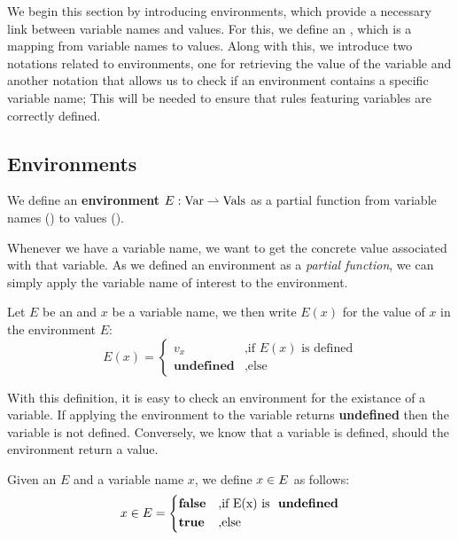 We begin this section by introducing environments, which provide a necessary link between variable names and values. For this, we define an , which is a mapping from variable names to values. Along with this, we introduce two notations related to environments, one for retrieving the value of the variable and another notation that allows us to check if an environment contains a specific variable name; This will be needed to ensure that rules featuring variables are correctly defined.

\subsection{Environments}\label{sec:environments}

\begin{definition}[Environment]\label{def:environment}
   We define an \textbf{environment} \(E: \text{\Var} \partialto \text{\Vals}\) as a partial function from variable names (\Var) to values (\Vals). 
\end{definition}

Whenever we have a variable name, we want to get the concrete value associated with that variable. As we defined an environment as a \emph{partial function}, we can simply apply the variable name of interest to the environment.

\begin{definition}\label{def:environment-getter}	
   Let \(E\) be an  and \(x\) be a variable name, we then write \(E(x)\) for the value of \(x\) in the environment \(E\):
   \[
      E(x) =
      \begin{cases}
	 v_x		    & \mbox{,if } E(x) \text{ is defined} \\
	 \textbf{undefined} &\mbox{,else}
      \end{cases}
   \]
\end{definition}

With this definition, it is easy to check an environment for the existance of a variable. If applying the environment to the variable returns \textbf{undefined} then the variable is not defined. Conversely, we know that a variable is defined, should the environment return a value.

\begin{definition}\label{def:in-environment}
   Given an  \(E\) and a variable name \(x\), we define \(\contains{E}{x}\) as follows:
   \[
      \contains{E}{x} = 
      \begin{cases*}
	 \false & \mbox{,if E(x) is } \textbf{undefined}\\
	 \true & \mbox{,else} 
      \end{cases*}
   \]
\end{definition}

